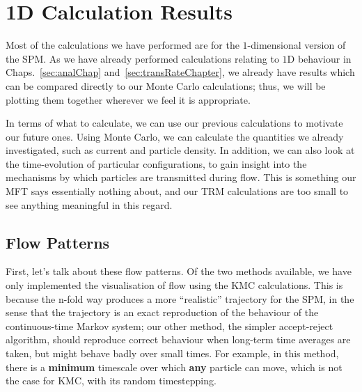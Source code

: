 \section{1D Calculation Results}
Most of the calculations we have performed are for the $1$-dimensional version of the SPM. As we 
have already performed calculations relating to $1$D behaviour in Chaps.~\ref{sec:analChap}
and~\ref{sec:transRateChapter}, we already have results which can be compared directly to our
Monte Carlo calculations; thus, we will be plotting them together wherever we feel it is
appropriate.

In terms of what to calculate, we can use our previous calculations to motivate our future ones.
Using Monte Carlo, we can calculate the quantities we already investigated, such as current and 
particle density. In addition, we can also look at the time-evolution of particular configurations,
to gain insight into the mechanisms by which particles are transmitted during flow. This is
something our MFT says essentially nothing about, and our TRM calculations are too small to see 
anything meaningful in this regard.

\subsection{Flow Patterns} \label{sec:flowPatternVis}

First, let's talk about these flow patterns. Of the two methods available, we have only implemented
the visualisation of flow using the KMC calculations. This is because the n-fold way produces
a more ``realistic'' trajectory for the SPM, in the sense that the trajectory is an exact 
reproduction of the behaviour of the continuous-time Markov system; our other method, the simpler
accept-reject algorithm, should reproduce correct behaviour when long-term time averages are taken,
but might behave badly over small times. For example, in this method, there is a \textbf{minimum} timescale
over which \textbf{any} particle can move, which is not the case for KMC, with its random timestepping.

